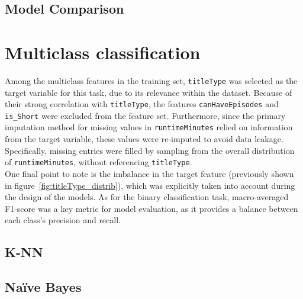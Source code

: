 \subsection{Model Comparison}

\section{Multiclass classification}\label{sec:multiclass_classification}
Among the multiclass features in the training set, \texttt{titleType} was selected as the target variable
for this task, due to its relevance within the dataset. Because of their strong correlation with
\texttt{titleType}, the features \texttt{canHaveEpisodes} and \texttt{is\_Short} were excluded from the
feature set. Furthermore, since the primary imputation method for missing values in \texttt{runtimeMinutes}
relied on information from the target variable, these values were re-imputed to avoid data leakage.
Specifically, missing entries were filled by sampling from the overall distribution of
\texttt{runtimeMinutes}, without referencing \texttt{titleType}.\\

One final point to note is the imbalance in the target feature (previously shown in
figure~\ref{fig:titleType_distrib}), which was explicitly taken into account
during the design of the models. As for the binary classification task, macro-averaged F1-score was
a key metric for model evaluation, as it provides a balance between each class's precision and recall.



\subsection{K-NN}
\subsection{Naïve Bayes}
